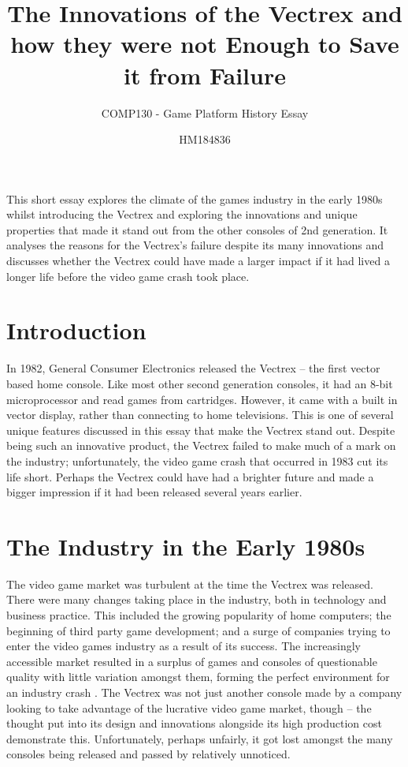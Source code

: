\documentclass{scrartcl}
\title{The Innovations of the Vectrex and how they were not Enough to Save it from Failure}
\subtitle{COMP130 - Game Platform History Essay}
\author{HM184836}
\begin{document}
\maketitle

\abstract
{
This short essay explores the climate of the games industry in the early 1980s whilst introducing the Vectrex and exploring the innovations and unique properties that made it stand out from the other consoles of 2nd generation. It analyses the reasons for the Vectrex's failure despite its many innovations and discusses whether the Vectrex could have made a larger impact if it had lived a longer life before the video game crash took place.
}


\section*{Introduction}
In 1982, General Consumer Electronics released the Vectrex -- the first vector based home console. Like most other second generation consoles, it had an 8-bit microprocessor and read games from cartridges. However, it came with a built in vector display, rather than connecting to home televisions. This is one of several unique features discussed in this essay that make the Vectrex stand out. Despite being such an innovative product, the Vectrex failed to make much of a mark on the industry; unfortunately, the video game crash that occurred in 1983 cut its life short. Perhaps the Vectrex could have had a brighter future and made a bigger impression if it had been released several years earlier.


\section*{The Industry in the Early 1980s}

The video game market was turbulent at the time the Vectrex was released. There were many changes taking place in the industry, both in technology and business practice. This included the growing popularity of home computers; the beginning of third party game development; and a surge of companies trying to enter the video games industry as a result of its success\cite{wolf:pong}. The increasingly accessible market resulted in a surplus of games and consoles of questionable quality with little variation amongst them, forming the perfect environment for an industry crash \cite{ernkvist:crash}. The Vectrex was not just another console made by a company looking to take advantage of the lucrative video game market, though -- the thought put into its design and innovations alongside its high production cost demonstrate this\cite{}. Unfortunately, perhaps unfairly, it got lost amongst the many consoles being released and passed by relatively unnoticed.
\end{document}
